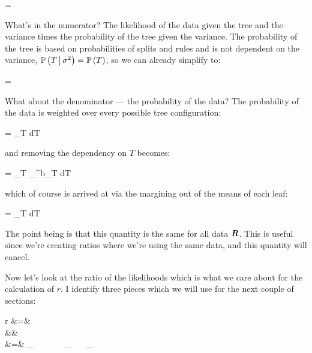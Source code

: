 \beqn
{} = 
\eeqn

What's in the numerator? The likelihood of the data given the tree and the variance times the probability of the tree given the variance. The probability of the tree is based on probabilities of splits and rules and is not dependent on the variance, $\mathbb{P}\left(T \, \big| \, \sigma^2\right) = \mathbb{P}\left(T\right)$, so we can already simplify to:

\beqn
{} = 
\eeqn

What about the denominator --- the probability of the data? The probability of the data is weighted over every possible tree configuration:

\beqn
\cprob{\R}{\sigsq} = \int_{T \in {}}   dT
\eeqn

and removing the dependency on $T$ becomes:

\beqn
\cprob{\R}{\sigsq} = \int_{T \in {}} \prod_{}^{b_T} \cprob{\Rlonetonl}{\sigsq}  dT
\eeqn

which of course is arrived at via the margining out of the means of each leaf:

\beqn
\cprob{\R}{\sigsq} = \int_{T \in {}}   dT
\eeqn

The point being is that this quantity is the same for all data $\boldsymbol{R}$. This is useful since we're creating ratios where we're using the same data, and this quantity will cancel.

Now let's look at the ratio of the likelihoods which is what we care about for the calculation of $r$. I identify three pieces which we will use for the next couple of sections:

\beqn
r &=&   \\
&& \quad\quad\quad\quad~~  \\
&=& _{} ~~~\times~~~ _{} ~~~\times {}_{}
\eeqn

